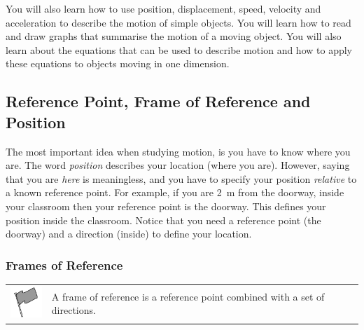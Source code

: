       \label{m38787*id62581}You will also learn how to use position, displacement, speed, velocity and acceleration to describe the motion of simple objects. You will learn how to read and draw graphs that summarise the motion of a moving object. You will also learn about the equations that can be used to describe motion and how to apply these equations to objects moving in one dimension.\par 
    
    \label{m38787*cid3}
            \subsection{ Reference Point, Frame of Reference and Position}
            \nopagebreak
            
      
      \label{m38787*id62597}The most important idea when studying motion, is you have to know where you are. The word \textsl{position} describes your location (where you are). However, saying that you are \textsl{here} is meaningless, and you have to specify your position \textsl{relative} to a known reference point. For example, if you are 2~m from the doorway, inside your classroom then your reference point is the doorway. This defines your position inside the classroom. Notice that you need a reference point (the doorway) and a direction (inside) to define your location.\par 
      \label{m38787*uid4}
            \subsubsection{ Frames of Reference}
            \nopagebreak
            
        
\par
            \label{m38787*fhsst!!!underscore!!!id82}\begin{definition}
	  \begin{tabular*}{15 cm}{m{15 mm}m{}}
	\hspace*{-50pt}  \includegraphics[width=0.5in]{col11305.imgs/psflag2.png}   & \Definition{   \label{id2526298}\textbf{ Frame of Reference }} { \label{m38787*meaningfhsst!!!underscore!!!id82}
        \label{m38787*id62637}A frame of reference is a reference point combined with a set of directions. \par 
         } 
      \end{tabular*}
      \end{definition}

